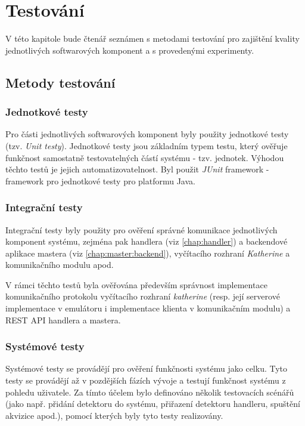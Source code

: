 

\chapter{Testování}\label{chap:test}
V této kapitole bude čtenář seznámen s metodami testování pro zajištění kvality jednotlivých softwarových komponent a s provedenými experimenty.

\section{Metody testování}
\subsection{Jednotkové testy}
Pro části jednotlivých softwarových komponent byly použity jednotkové testy \cite{testing_evans} (tzv. \textit{Unit testy}). Jednotkové testy jsou základním typem testu, který ověřuje funkčnost samostatně testovatelných částí systému - tzv. jednotek. Výhodou těchto testů je jejich automatizovatelnost. Byl použit \textit{JUnit} framework - framework pro jednotkové testy pro platformu Java. 

\subsection{Integrační testy}
Integrační testy byly použity pro ověření správné komunikace jednotlivých komponent systému, zejména pak handlera (viz \ref{chap:handler}) a backendové aplikace mastera (viz \ref{chap:master:backend}), vyčítacího rozhraní \textit{Katherine} a komunikačního modulu apod.

V rámci těchto testů byla ověřována především správnost implementace komunikačního protokolu vyčítacího rozhraní \textit{katherine} (resp. její serverové implementace v emulátoru i implementace klienta v komunikačním modulu) a REST API handlera a mastera.

\subsection{Systémové testy}
Systémové testy se provádějí pro ověření funkčnosti systému jako celku. Tyto testy se provádějí až v pozdějších fázích vývoje a testují funkčnost systému z pohledu uživatele. Za tímto účelem bylo definováno několik testovacích scénářů (jako např. přidání detektoru do systému, přiřazení detektoru handleru, spuštění akvizice apod.), pomocí kterých byly tyto testy realizovány.

